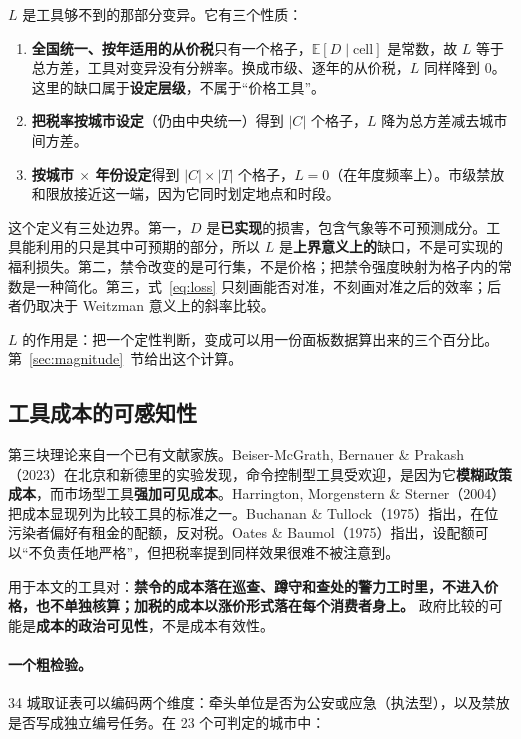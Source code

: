 $L$ 是工具够不到的那部分变异。它有三个性质：

\begin{enumerate}
  \item \textbf{全国统一、按年适用的从价税}只有一个格子，$\mathbb{E}[D\mid\text{cell}]$ 是常数，故 $L$ 等于总方差，工具对变异没有分辨率。换成市级、逐年的从价税，$L$ 同样降到 0。这里的缺口属于\textbf{设定层级}，不属于“价格工具”。
  \item \textbf{把税率按城市设定}（仍由中央统一）得到 $|C|$ 个格子，$L$ 降为总方差减去城市间方差。
  \item \textbf{按城市 $\times$ 年份设定}得到 $|C|\times|T|$ 个格子，$L=0$（在年度频率上）。市级禁放和限放接近这一端，因为它同时划定地点和时段。
\end{enumerate}

这个定义有三处边界。第一，$D$ 是\textbf{已实现}的损害，包含气象等不可预测成分。工具能利用的只是其中可预期的部分，所以 $L$ 是\textbf{上界意义上的}缺口，不是可实现的福利损失。第二，禁令改变的是可行集，不是价格；把禁令强度映射为格子内的常数是一种简化。第三，式~\eqref{eq:loss} 只刻画能否对准，不刻画对准之后的效率；后者仍取决于 Weitzman 意义上的斜率比较。

$L$ 的作用是：把一个定性判断，变成可以用一份面板数据算出来的三个百分比。第~\ref{sec:magnitude}~节给出这个计算。

\subsection{工具成本的可感知性}\label{sec:visibility}

第三块理论来自一个已有文献家族。Beiser-McGrath, Bernauer \& Prakash（2023）在北京和新德里的实验发现，命令控制型工具受欢迎，是因为它\textbf{模糊政策成本}，而市场型工具\textbf{强加可见成本}。Harrington, Morgenstern \& Sterner（2004）把成本显现列为比较工具的标准之一。Buchanan \& Tullock（1975）指出，在位污染者偏好有租金的配额，反对税。Oates \& Baumol（1975）指出，设配额可以“不负责任地严格”，但把税率提到同样效果很难不被注意到。

用于本文的工具对：\textbf{禁令的成本落在巡查、蹲守和查处的警力工时里，不进入价格，也不单独核算；加税的成本以涨价形式落在每个消费者身上。} 政府比较的可能是\textbf{成本的政治可见性}，不是成本有效性。

\paragraph{一个粗检验。} 34 城取证表可以编码两个维度：牵头单位是否为公安或应急（执法型），以及禁放是否写成独立编号任务。在 23 个可判定的城市中：

